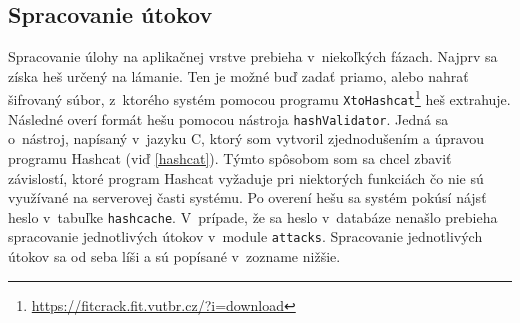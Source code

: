 \documentclass[slovak]{fitthesis}
\begin{document}
\subsection{Spracovanie útokov}
Spracovanie úlohy na aplikačnej vrstve prebieha v~niekoľkých fázach. Najprv sa získa heš určený na lámanie. Ten je možné buď zadať priamo, alebo nahrať šifrovaný súbor, z~ktorého systém pomocou programu \texttt{XtoHashcat}\footnote{\url{https://fitcrack.fit.vutbr.cz/?i=download}} heš extrahuje. Následné overí formát hešu pomocou nástroja \texttt{hashValidator}. Jedná sa o~nástroj, napísaný v~jazyku C, ktorý som vytvoril zjednodušením a úpravou programu Hashcat (viď \ref{hashcat}). Týmto spôsobom som sa chcel zbaviť závislostí, ktoré program Hashcat vyžaduje pri niektorých funkciách čo nie sú využívané na serverovej časti systému. Po overení hešu sa systém pokúsí nájsť heslo v~tabuľke \texttt{hashcache}. V~prípade, že sa heslo v~databáze nenašlo prebieha spracovanie jednotlivých útokov v~module \texttt{attacks}. Spracovanie jednotlivých útokov sa od seba líši a sú popísané v~zozname nižšie.
\end{document}
